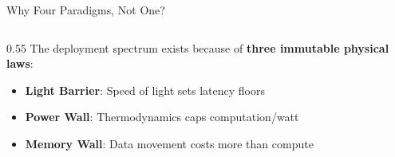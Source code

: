 \documentclass[aspectratio=169, 12pt]{beamer}
\begin{document}
\begin{frame}{Why Four Paradigms, Not One?}
\note{
%
%
%
%
%
}

\footnotesize
\begin{columns}[T]
  \begin{column}{0.55\textwidth}
    The deployment spectrum exists because of \textbf{three immutable physical laws}:

    \vspace{0.1cm}
    \begin{itemize}\setlength\itemsep{1pt}
      \item \textcolor{routingstroke}{\textbf{Light Barrier}}: Speed of light sets latency floors
      \item \textcolor{errorstroke}{\textbf{Power Wall}}: Thermodynamics caps computation/watt
      \item \textcolor{datastroke}{\textbf{Memory Wall}}: Data movement costs more than compute
    \end{itemize}


\end{column}
\end{columns}
\end{frame}
\end{document}
